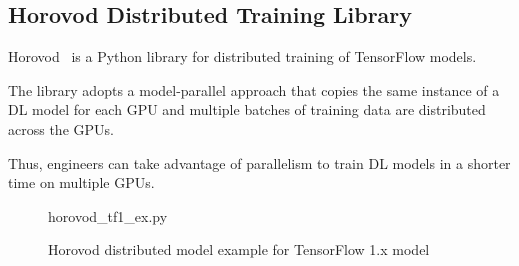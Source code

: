 \subsection{Horovod Distributed Training Library}

Horovod~\cite{sergeev2018horovod} is a Python library for distributed training 
of TensorFlow models. 
\begin{inred}
The library adopts a model-parallel approach that copies the same instance of
a DL model for each GPU and multiple batches of training data are distributed
across the GPUs.
\end{inred}
Thus, engineers can take advantage of parallelism to train DL models in a
shorter time on multiple GPUs.

\begin{figure}[ht!]
 
{horovod_tf1_ex.py}
  \caption{Horovod distributed model example for TensorFlow 1.x model}
\label{fig:back:hvd1} 
\end{figure}

